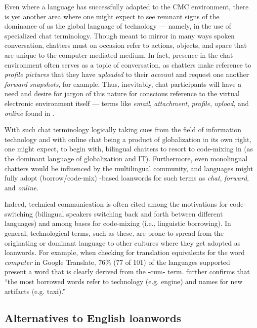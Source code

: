 \documentclass[output=paper,newtxmath,modfonts,nonflat,hidelinks]{langsci/langscibook}
\begin{document}
Even where a language has successfully adapted to the CMC environment, there is yet another area where one might expect to see remnant signs of the dominance of  as the global language of technology — namely, in the use of specialized chat terminology. Though meant to mirror in many ways spoken conversation, chatters must on occasion refer to actions, objects, and space that are unique to the computer-mediated medium. In fact, presence in the chat environment often serves as a topic of conversation, as chatters make reference to \textit{profile pictures} that they have \textit{uploaded} to their \textit{account} and request one another \textit{forward} \textit{snapshots}, for example. Thus, inevitably, chat participants will have a need and desire for jargon of this nature for conscious reference to the virtual electronic environment itself — terms like \textit{email}, \textit{attachment}, \textit{profile}, \textit{upload}, and \textit{online} found in . 

With such chat terminology logically taking cues from the field of information technology and with online chat being a product of globalization in its own right, one might expect, to begin with, bilingual chatters to resort to code-mixing in  (as the dominant language of globalization and IT). Furthermore, even monolingual chatters would be influenced by the multilingual community, and languages might fully adopt (borrow/code-mix) -based loanwords for such terms as \textit{chat}, \textit{forward}, and \textit{online}.

Indeed, technical communication is often cited among the motivations for code-switching (bilingual speakers switching back and forth between different languages) and among bases for code-mixing (i.e., linguistic borrowing). In general, technological terms, such as these, are prone to spread from the originating or dominant language to other cultures where they get adopted as loanwords. For example, when checking for translation equivalents for the word \textit{computer} in Google Translate, 76\% (77 of 101) of the languages supported present a word that is clearly derived from the -cum- term. \citet{daulton2012} further confirms that “the most borrowed words refer to technology (e.g. engine) and names for new artifacts (e.g. taxi).”

\subsection{Alternatives to English loanwords}
\end{document}
